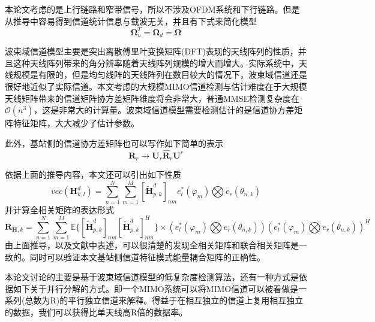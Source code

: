 \documentclass[bachelor,nocolorlinks, printoneside]{seuthesis} %
\begin{document}
\begin{Main}
本论文考虑的是上行链路和窄带信号，所以不涉及OFDM系统和下行链路。但是从推导中容易得到信道统计信息与载波无关，并且有下式来简化模型
\begin{equation}\label{key}
\bm{\Omega}_u^T = \bm{\Omega}_d =\bm{\Omega}
\end{equation}

波束域信道模型主要是突出离散傅里叶变换矩阵(DFT)表现的天线阵列的性质，并且这种天线阵列带来的角分辨率随着天线阵列规模的增大而增大。实际系统中，天线规模是有限的，但是均匀线阵的天线阵列在数目较大的情况下，波束域信道还是很好地近似了实际信道。本文考虑的大规模MIMO信道检测与估计难度在于大规模天线矩阵带来的信道矩阵协方差矩阵维度将会非常大，普通MMSE检测复杂度在$\mathcal{O}(n^3)$，这是非常大的计算量。波束域信道模型需要检测估计的是信道协方差矩阵特征矩阵，大大减少了估计参数。

此外，基站侧的信道协方差矩阵也可以写作如下简单的表示
\begin{equation}\label{key}
\mathbf{R}_r \rightarrow \mathbf{U}_r \hat{\mathbf{R}}_r \mathbf{U}^{r}
\end{equation}

依据上面的推导内容，本文还可以引出如下性质
\begin{equation}\label{key}
vec(\mathbf{H}_{k,l}^{d}) = \sum_{n=1}^{N} \sum_{m=1}^{M} [\tilde{\mathbf{H}}_{p,k}^{d}]_{nm} e^{*}_{t}(\varphi_{m} )\bigotimes e_{r}(\theta_{n,k})
\end{equation}
并计算全相关矩阵的表达形式
\begin{equation}\label{key}
\mathbf{R}_{\mathbf{H},k} = \sum_{n=1}^{N} \sum_{m=1}^{M} \mathbb{E} \lbrace [\tilde{\mathbf{H}}_{p,k}^{d}]_{nm} [\tilde{\mathbf{H}}_{p,k}^{d}]_{nm}^{H}   \rbrace \times
(e^{*}_{t}(\varphi_{m} )\bigotimes e_{r}(\theta_{n,k})) (e^{*}_{t}(\varphi_{m} )\bigotimes e_{r}(\theta_{n,k}))^{H}
\end{equation}
由上面推导，以及文献中表述，可以很清楚的发现全相关矩阵和联合相关矩阵是一致的。同时可以验证本文基站侧信道特征模式能量耦合矩阵的正确性。

本论文讨论的主要是基于波束域信道模型的低复杂度检测算法，还有一种方式是依据如下关于并行分解的方式。即一个MIMO系统可以将MIMO信道可以被看做是一系列(总数为R)的平行独立信道来解释。得益于在相互独立的信道上复用相互独立的数据，我们可以获得比单天线高R倍的数据率。


\end{Main}
\end{document}
